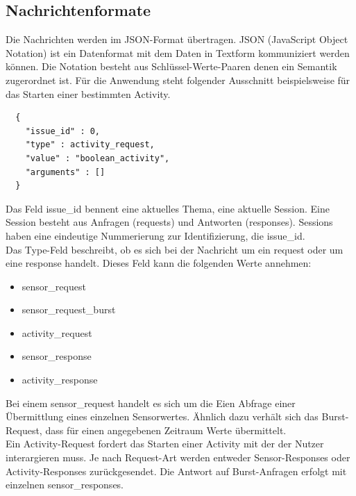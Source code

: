 \documentclass[11pt,a4paper]{report}
\begin{document}
\subsection*{Nachrichtenformate}
Die Nachrichten werden im JSON-Format übertragen.
JSON (JavaScript Object Notation) ist ein Datenformat mit dem Daten in Textform kommuniziert werden können.
Die Notation besteht aus Schlüssel-Werte-Paaren denen ein Semantik zugerordnet ist.
Für die Anwendung steht folgender Ausschnitt beispielsweise für das Starten einer bestimmten Activity.
\begin{lstlisting}
  {
    "issue_id" : 0,
    "type" : activity_request,
    "value" : "boolean_activity",
    "arguments" : []
  }
\end{lstlisting}
Das Feld issue\_id bennent eine aktuelles Thema, eine aktuelle Session.
Eine Session besteht aus Anfragen (requests) und Antworten (responses).
Sessions haben eine eindeutige Nummerierung zur Identifizierung, die issue\_id.
\\
Das Type-Feld beschreibt, ob es sich bei der Nachricht um ein request oder um eine response handelt.
Dieses Feld kann die folgenden Werte annehmen:
\begin{itemize}
  \item sensor\_request
  \item sensor\_request\_burst
  \item activity\_request
  \item sensor\_response
  \item activity\_response
\end{itemize}
Bei einem sensor\_request handelt es sich um die Eien Abfrage einer Übermittlung eines einzelnen Sensorwertes.
Ähnlich dazu verhält sich das Burst-Request, dass für einen angegebenen Zeitraum Werte übermittelt.
\\
Ein Activity-Request fordert das Starten einer Activity mit der der Nutzer interargieren muss.
Je nach Request-Art werden entweder Sensor-Responses oder Activity-Responses zurückgesendet.
Die Antwort auf Burst-Anfragen erfolgt mit einzelnen sensor\_responses.
\end{document}
